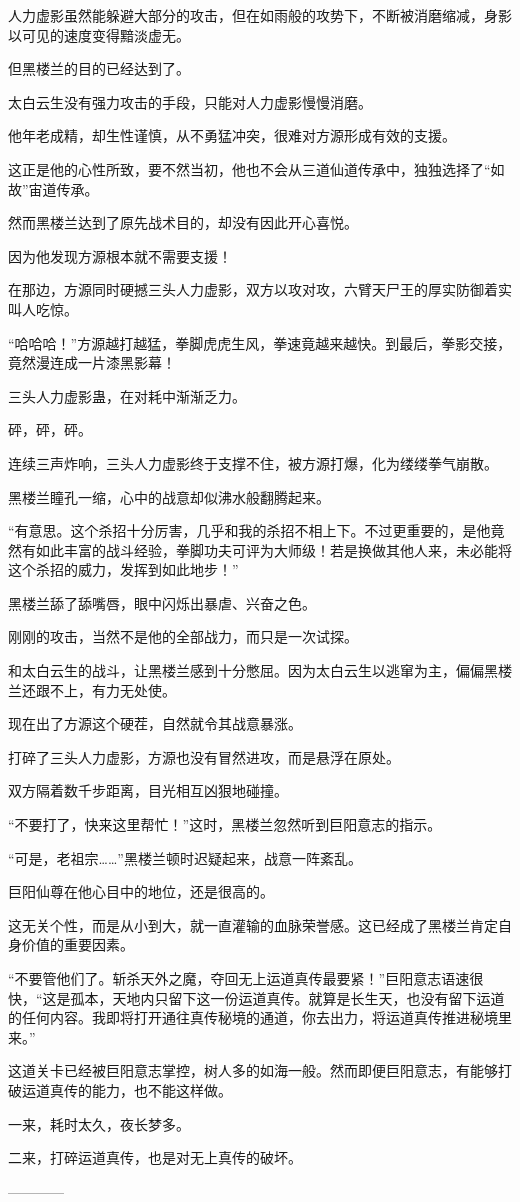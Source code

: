\begin{this_body}
人力虚影虽然能躲避大部分的攻击，但在如雨般的攻势下，不断被消磨缩减，身影以可见的速度变得黯淡虚无。

但黑楼兰的目的已经达到了。

太白云生没有强力攻击的手段，只能对人力虚影慢慢消磨。

他年老成精，却生性谨慎，从不勇猛冲突，很难对方源形成有效的支援。

这正是他的心性所致，要不然当初，他也不会从三道仙道传承中，独独选择了“如故”宙道传承。

然而黑楼兰达到了原先战术目的，却没有因此开心喜悦。

因为他发现方源根本就不需要支援！

在那边，方源同时硬撼三头人力虚影，双方以攻对攻，六臂天尸王的厚实防御着实叫人吃惊。

“哈哈哈！”方源越打越猛，拳脚虎虎生风，拳速竟越来越快。到最后，拳影交接，竟然漫连成一片漆黑影幕！

三头人力虚影蛊，在对耗中渐渐乏力。

砰，砰，砰。

连续三声炸响，三头人力虚影终于支撑不住，被方源打爆，化为缕缕拳气崩散。

黑楼兰瞳孔一缩，心中的战意却似沸水般翻腾起来。

“有意思。这个杀招十分厉害，几乎和我的杀招不相上下。不过更重要的，是他竟然有如此丰富的战斗经验，拳脚功夫可评为大师级！若是换做其他人来，未必能将这个杀招的威力，发挥到如此地步！”

黑楼兰舔了舔嘴唇，眼中闪烁出暴虐、兴奋之色。

刚刚的攻击，当然不是他的全部战力，而只是一次试探。

和太白云生的战斗，让黑楼兰感到十分憋屈。因为太白云生以逃窜为主，偏偏黑楼兰还跟不上，有力无处使。

现在出了方源这个硬茬，自然就令其战意暴涨。

打碎了三头人力虚影，方源也没有冒然进攻，而是悬浮在原处。

双方隔着数千步距离，目光相互凶狠地碰撞。

“不要打了，快来这里帮忙！”这时，黑楼兰忽然听到巨阳意志的指示。

“可是，老祖宗……”黑楼兰顿时迟疑起来，战意一阵紊乱。

巨阳仙尊在他心目中的地位，还是很高的。

这无关个性，而是从小到大，就一直灌输的血脉荣誉感。这已经成了黑楼兰肯定自身价值的重要因素。

“不要管他们了。斩杀天外之魔，夺回无上运道真传最要紧！”巨阳意志语速很快，“这是孤本，天地内只留下这一份运道真传。就算是长生天，也没有留下运道的任何内容。我即将打开通往真传秘境的通道，你去出力，将运道真传推进秘境里来。”

这道关卡已经被巨阳意志掌控，树人多的如海一般。然而即便巨阳意志，有能够打破运道真传的能力，也不能这样做。

一来，耗时太久，夜长梦多。

二来，打碎运道真传，也是对无上真传的破坏。

------------

\end{this_body}

